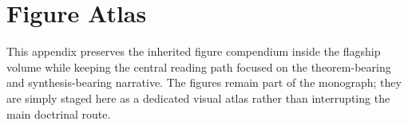 \section{Figure Atlas}
\label{sec:oc-core-1-3-figure-atlas}

This appendix preserves the inherited figure compendium inside the flagship
volume while keeping the central reading path focused on the theorem-bearing
and synthesis-bearing narrative. The figures remain part of the monograph; they
are simply staged here as a dedicated visual atlas rather than interrupting the
main doctrinal route.

\begingroup
\let\ocappendixsection\section
\let\ocappendixsubsection\subsection
\let\ocappendixsubsubsection\subsubsection
\renewcommand{\section}{\ocappendixsubsection}
\renewcommand{\subsection}{\ocappendixsubsubsection}

\endgroup
